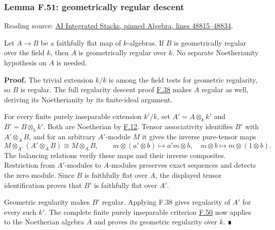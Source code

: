 \documentclass[11pt,a4paper,openany]{report}
\begin{document}
\label{AG-RG-S05-algebra-lemma-geometrically-regular-descent}

\subsubsection{Lemma F.51: geometrically regular descent}\label{AG-RG-S05-lemma-f.51-geometrically-regular-descent}

Reading source: \href{https://github.com/KokunoYumeto/unofficial-stacks-project-ai-drafts/blob/565b10e987aba5969b21145a0833f42d69f96790/algebra.tex\#L48815-L48834}{AI Integrated Stacks, pinned Algebra, lines 48815--48834}.

Let \(A\to B\) be a faithfully flat map of \(k\)-algebras. If \(B\) is geometrically regular over the field \(k\), then \(A\) is geometrically regular over \(k\). No separate Noetherianity hypothesis on \(A\) is needed.

\textbf{Proof.} The trivial extension \(k/k\) is among the field tests for geometric regularity, so \(B\) is regular. The full regularity descent proof \hyperref[AG-RG-S05-algebra-lemma-descent-regular]{F.38} makes \(A\) regular as well, deriving its Noetherianity by its finite-ideal argument.

For every finite purely inseparable extension \(k'/k\), set \(A'=A\otimes_kk'\) and \(B'=B\otimes_kk'\). Both are Noetherian by \hyperref[AG-RG-S05-algebra-lemma-Noetherian-field-extension]{F.12}. Tensor associativity identifies \(B'\) with \(A'\otimes_AB\), and for an arbitrary \(A'\)-module \(M\) it gives the inverse pure-tensor maps \[M\otimes_{A'}(A'\otimes_AB)\cong M\otimes_AB,\qquad
m\otimes(a'\otimes b)\longmapsto a'm\otimes b,\quad
m\otimes b\longmapsto m\otimes(1\otimes b).\] The balancing relations verify these maps and their inverse composites. Restriction from \(A'\)-modules to \(A\)-modules preserves exact sequences and detects the zero module. Since \(B\) is faithfully flat over \(A\), the displayed tensor identification proves that \(B'\) is faithfully flat over \(A'\).

Geometric regularity makes \(B'\) regular. Applying F.38 gives regularity of \(A'\) for every such \(k'\). The complete finite purely inseparable criterion \hyperref[AG-RG-S05-algebra-lemma-geometrically-regular]{F.50} now applies to the Noetherian algebra \(A\) and proves its geometric regularity over \(k\). ∎

\label{AG-RG-S05-algebra-lemma-geometrically-regular-over-subfields}
\end{document}
